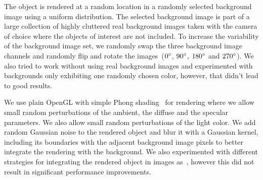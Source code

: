 \documentclass[10pt,twocolumn,letterpaper]{article}
\begin{document}
The object is rendered at a random location in a randomly selected
background image using a uniform  distribution. The selected background image is
part of  a large collection  of highly cluttered real  background images taken
with the camera  of choice where the objects  of interest are
not included.
To increase  the variability of the  background image set, we  randomly swap the
three   background   image  channels   and   randomly   flip  and   rotate   the
images~($0\degree$, $90\degree$,  $180\degree$ and $270\degree$).  
We also tried to work without using real background images 
and experimented with backgrounds only exhibiting one randomly chosen color, however,
that didn't lead to good results.

We  use plain OpenGL with simple Phong  shading~\cite{Phong75}   for  rendering  where  we   allow  small  random
perturbations of the ambient, the diffuse  and the specular parameters.  We also
allow small  random perturbations  of the  light color.   We add  random Gaussian
noise to the rendered  object and blur it with a  Gaussian kernel, including its
boundaries  with  the  adjacent  background  image pixels  to  better
integrate  the  rendering  with  the  background.   We  also  experimented  with
different   strategies   for  integrating   the   rendered   object  in   images
as~\cite{Dwibedi17},  however this  did  not result  in significant  performance
improvements.




\end{document}

